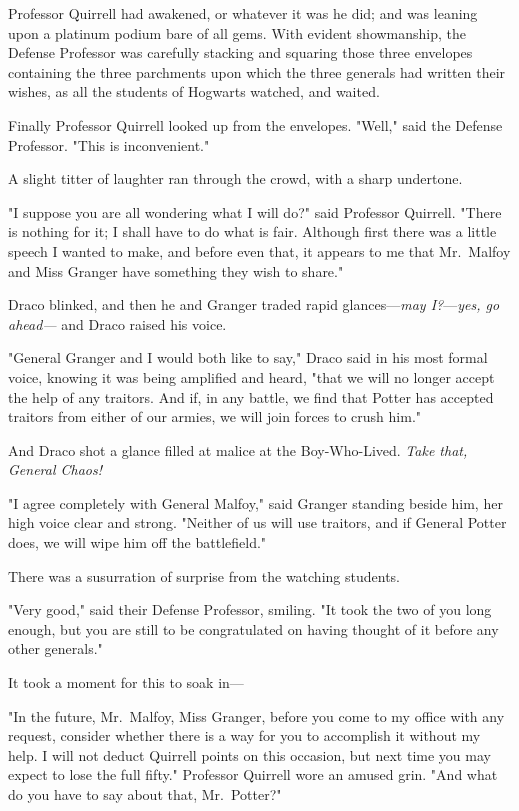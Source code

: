 Professor Quirrell had{\el} awakened, or whatever it was he did; and was
leaning upon a platinum podium bare of all gems. With evident showmanship, the
Defense Professor was carefully stacking and squaring those three envelopes
containing the three parchments upon which the three generals had written their
wishes, as all the students of Hogwarts watched, and waited.

Finally Professor Quirrell looked up from the envelopes. "Well," said the
Defense Professor. "This is inconvenient."

A slight titter of laughter ran through the crowd, with a sharp undertone.

"I suppose you are all wondering what I will do?" said Professor Quirrell.
"There is nothing for it; I shall have to do what is fair. Although first there
was a little speech I wanted to make, and before even that, it appears to me
that Mr.~Malfoy and Miss Granger have something they wish to share."

Draco blinked, and then he and Granger traded rapid glances---\emph{may
I?}---\emph{yes, go ahead---} and Draco raised his voice.

"General Granger and I would both like to say," Draco said in his most formal
voice, knowing it was being amplified and heard, "that we will no longer accept
the help of any traitors. And if, in any battle, we find that Potter has
accepted traitors from either of our armies, we will join forces to crush him."

And Draco shot a glance filled at malice at the Boy-Who-Lived. \emph{Take that,
General Chaos!}

"I agree completely with General Malfoy," said Granger standing beside him, her
high voice clear and strong. "Neither of us will use traitors, and if General
Potter does, we will wipe him off the battlefield."

There was a susurration of surprise from the watching students.

"Very good," said their Defense Professor, smiling. "It took the two of you
long enough, but you are still to be congratulated on having thought of it
before any other generals."

It took a moment for this to soak in---

"In the future, Mr.~Malfoy, Miss Granger, before you come to my office with any
request, consider whether there is a way for you to accomplish it without my
help. I will not deduct Quirrell points on this occasion, but next time you may
expect to lose the full fifty." Professor Quirrell wore an amused grin. "And
what do you have to say about that, Mr.~Potter?"

